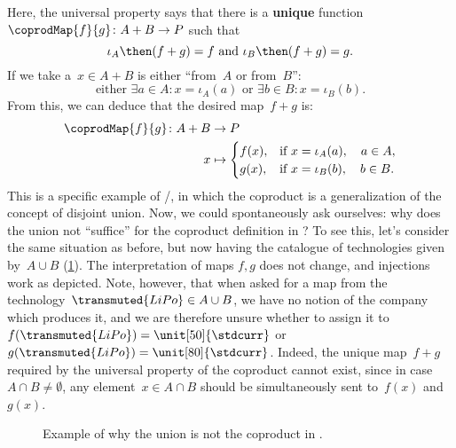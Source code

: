 \begin{example}
    Here, the universal property says that there is a \textbf{unique} function~$\coprodMap{f}{g}\colon A+B\to P$ such that
    \begin{equation*}
        \iota_A\then (f+ g)=f \text{ and }\iota_B\then (f+ g)=g.
    \end{equation*}
    If we take a~$x\in A+B$ is either ``from~$A$ or from~$B$'':
    \begin{equation*}
        \text{either } \exists a\in A:x=\iota_A(a) \text{ or }\exists b\in B:x=\iota_B(b).
    \end{equation*}
    From this, we can deduce that the desired map~$f+g$ is:
    \begin{equation*}
        \begin{aligned}
            \coprodMap{f}{g} \colon  A + B &\to P \\
            x &   \mapsto
            \begin{cases}
                f(x),& \text{if } x=\iota_A(a),\quad a \in A, \\
                g(x),& \text{if } x=\iota_B(b),\quad b \in B.
            \end{cases}
        \end{aligned}
    \end{equation*}
    This is a specific example of \Set/\FinSet, in which the coproduct is a generalization of the concept of disjoint union. Now, we could spontaneously ask ourselves: why does the union not ``suffice'' for the coproduct definition in \Set? To see this, let's consider the same situation as before, but now having the catalogue of technologies given by~$A\cup B$ (\cref{fig:coprod_batteries_2}). The interpretation of maps $f,g$ does not change, and injections work as depicted. Note, however, that when asked for a map from the technology~$\transmuted{LiPo}\in A\cup B$, we have no notion of the company which produces it, and we are therefore unsure whether to assign it to~$f(\transmuted{LiPo})=\unit[50]{\stdcurr}$ or~$g(\transmuted{LiPo})=\unit[80]{\stdcurr}$. Indeed, the unique map~$f+g$ required by the universal property of the coproduct cannot exist, since in case~$A\cap B\neq \emptyset$, any element~$x\in A\cap B$ should be simultaneously sent to~$f(x)$ and~$g(x)$.

    \begin{figure}[h!]
        \centering
        \caption{Example of why the union is not the coproduct in \Set.}
        \label{fig:coprod_batteries_2}
    \end{figure}
\end{example}


